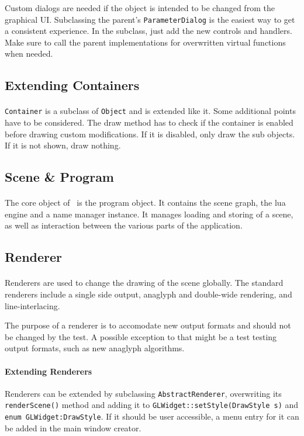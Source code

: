Custom dialogs are needed if the object is intended to be changed from the graphical UI.
Subclassing the parent's \lstinline{ParameterDialog} is the easiest way to get a consistent experience.
In the subclass, just add the new controls and handlers.
Make sure to call the parent implementations for overwritten virtual functions when needed.


\subsection{Extending Containers}
\paragraph{}
\lstinline{Container} is a subclass of \lstinline{Object} and is extended like it.
Some additional points have to be considered.
The draw method has to check if the container is enabled before drawing custom modifications.
If it is disabled, only draw the sub objects.
If it is not shown, draw nothing.


\subsection{Scene \& Program}
\paragraph{}
The core object of \ER\ is the program object.
It contains the scene graph, the lua engine and a name manager instance.
It manages loading and storing of a scene, as well as interaction between the various parts of the application.


\subsection{Renderer}
\paragraph{}
Renderers are used to change the drawing of the scene globally.
The standard renderers include a single side output, anaglyph and double-wide rendering, and line-interlacing.

The purpose of a renderer is to accomodate new output formats and should not be changed by the test.
A possible exception to that might be a test testing output formats, such as new anaglyph algorithms.

\paragraph{Extending Renderers}
Renderers can be extended by subclassing \lstinline{AbstractRenderer}, overwriting its \lstinline{renderScene()} method and adding it to \lstinline{GLWidget::setStyle(DrawStyle s)} and \lstinline{enum GLWidget:DrawStyle}.
If it should be user accessible, a menu entry for it can be added in the main window creator.


